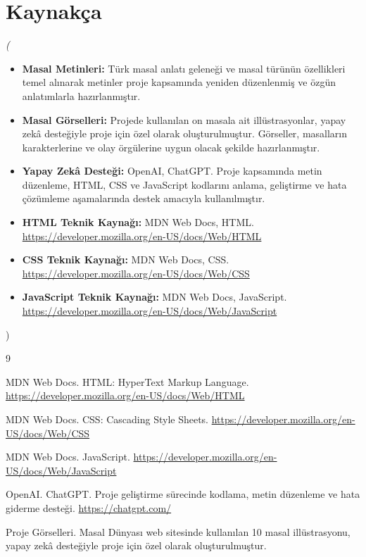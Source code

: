 \documentclass[12pt,a4paper]{article}
\newcommand{\aciklama}[1]{{\color{gray}\itshape (#1)}}
\begin{document}
\section{Kaynakça}
\aciklama{
\begin{itemize}
    \item \textbf{Masal Metinleri:} Türk masal anlatı geleneği ve masal türünün özellikleri temel alınarak metinler proje kapsamında yeniden düzenlenmiş ve özgün anlatımlarla hazırlanmıştır.

    \item \textbf{Masal Görselleri:} Projede kullanılan on masala ait illüstrasyonlar, yapay zekâ desteğiyle proje için özel olarak oluşturulmuştur. Görseller, masalların karakterlerine ve olay örgülerine uygun olacak şekilde hazırlanmıştır.

    \item \textbf{Yapay Zekâ Desteği:} OpenAI, ChatGPT. Proje kapsamında metin düzenleme, HTML, CSS ve JavaScript kodlarını anlama, geliştirme ve hata çözümleme aşamalarında destek amacıyla kullanılmıştır.

    \item \textbf{HTML Teknik Kaynağı:} MDN Web Docs, HTML. \url{https://developer.mozilla.org/en-US/docs/Web/HTML}

    \item \textbf{CSS Teknik Kaynağı:} MDN Web Docs, CSS. \url{https://developer.mozilla.org/en-US/docs/Web/CSS}

    \item \textbf{JavaScript Teknik Kaynağı:} MDN Web Docs, JavaScript. \url{https://developer.mozilla.org/en-US/docs/Web/JavaScript}
\end{itemize}
}
\begin{thebibliography}{9}

MDN Web Docs. HTML: HyperText Markup Language.
\url{https://developer.mozilla.org/en-US/docs/Web/HTML}

MDN Web Docs. CSS: Cascading Style Sheets.
\url{https://developer.mozilla.org/en-US/docs/Web/CSS}

MDN Web Docs. JavaScript.
\url{https://developer.mozilla.org/en-US/docs/Web/JavaScript}

OpenAI. ChatGPT.
Proje geliştirme sürecinde kodlama, metin düzenleme
ve hata giderme desteği.
\url{https://chatgpt.com/}

Proje Görselleri.
Masal Dünyası web sitesinde kullanılan 10 masal
illüstrasyonu, yapay zekâ desteğiyle proje
için özel olarak oluşturulmuştur.

\end{thebibliography}
\end{document}

